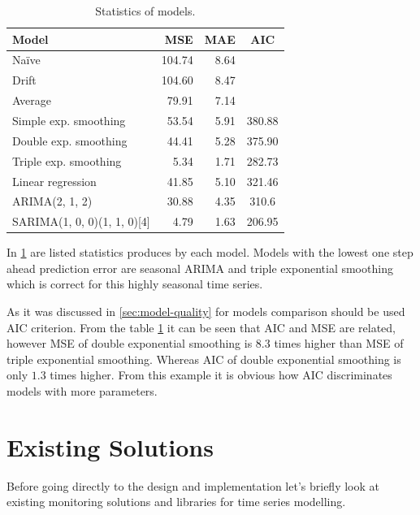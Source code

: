     \begin{table}[h]
        \begin{center}
            \begin{tabular}{l|r|r|c}
                    \textbf{Model} & \textbf{MSE} & \textbf{MAE} & \textbf{AIC} \\ \hline \hline
                    Na\"{i}ve & 104.74 & 8.64 & \\
                    Drift & 104.60 & 8.47 & \\
                    Average & 79.91 & 7.14 & \\ \hline
                    Simple exp. smoothing & 53.54 & 5.91 & 380.88 \\
                    Double exp. smoothing & 44.41 & 5.28 & 375.90 \\
                    Triple exp. smoothing & 5.34 & 1.71 & 282.73 \\ \hline
                    Linear regression & 41.85 & 5.10 & 321.46 \\ \hline
                    ARIMA(2, 1, 2) & 30.88 & 4.35 & 310.6 \\
                    SARIMA(1, 0, 0)(1, 1, 0)[4] & 4.79 & 1.63 & 206.95 \\
            \end{tabular}
            \caption{Statistics of models.}
            \label{tab:models-stat}
        \end{center}
    \end{table}

    In \ref{tab:models-stat} are listed statistics produces by each model. Models with the lowest one step ahead
    prediction error are seasonal ARIMA and triple exponential smoothing which is correct for this highly seasonal time
    series.

    As it was discussed in \ref{sec:model-quality} for models comparison should be used AIC criterion. From the
    table \ref{tab:models-stat} it can be seen that AIC and MSE are related, however MSE of double exponential smoothing
    is $8.3$ times higher than MSE of triple exponential smoothing. Whereas AIC of double exponential smoothing is
    only $1.3$ times higher. From this example it is obvious how AIC discriminates models with more parameters.

\chapter{Existing Solutions}
Before going directly to the design and implementation let's briefly look at existing monitoring solutions and libraries
for time series modelling.

